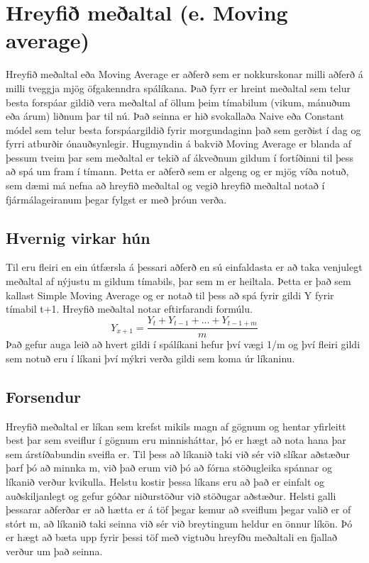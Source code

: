 \section{Hreyfið meðaltal (e. Moving average)}
Hreyfið meðaltal eða Moving Average er aðferð sem er nokkurskonar milli aðferð á milli tveggja mjög öfgakenndra spálíkana. Það fyrr er hreint meðaltal sem telur besta forspáar gildið vera meðaltal af öllum þeim tímabilum (vikum, mánuðum eða árum) liðnum þar til nú. Það seinna er hið svokallaða Naive eða Constant módel sem telur besta forspáargildið fyrir morgundaginn það sem gerðist í dag og fyrri atburðir ónauðsynlegir. Hugmyndin á bakvið Moving Average er blanda af þessum tveim þar sem meðaltal er tekið af ákveðnum gildum í fortíðinni til þess að spá um fram í tímann. Þetta er aðferð sem er algeng og er mjög víða notuð, sem dæmi má nefna að hreyfið meðaltal og vegið hreyfið meðaltal notað í fjármálageiranum þegar fylgst er með þróun verða. 

\subsection{Hvernig virkar hún}
Til eru fleiri en ein útfærsla á þessari aðferð en sú einfaldasta er að taka venjulegt meðaltal af nýjustu m gildum tímabils, þar sem m er heiltala. Þetta er það sem kallast Simple Moving Average og er notað til þess að spá fyrir gildi Y fyrir tímabil t+1. Hreyfið meðaltal notar eftirfarandi formúlu.
$$Y_{x+1} = \frac{Y_t + Y_{t-1} + ... + Y_{t-1+m}}{m}$$
Það gefur auga leið að hvert gildi í spálíkani hefur því vægi 1/m og því fleiri gildi sem notuð eru í líkani því mýkri verða gildi sem koma úr líkaninu. 


\subsection{Forsendur}
Hreyfið meðaltal er líkan sem krefst mikils magn af gögnum og hentar yfirleitt best þar sem sveiflur í gögnum eru minnisháttar, þó er hægt að nota hana þar sem árstíðabundin sveifla er. Til þess að líkanið taki við sér við slíkar aðstæður þarf þó að minnka m, við það erum við þó að fórna stöðugleika spánnar og líkanið verður kvikulla.  
Helstu kostir þessa líkans eru að það er einfalt og auðskiljanlegt og gefur góðar niðurstöður við stöðugar aðstæður. Helsti galli þessarar aðferðar er að hætta er á töf þegar kemur að sveiflum þegar valið er of stórt m, að líkanið taki seinna við sér við breytingum heldur en önnur líkön. Þó er hægt að bæta upp fyrir þessi töf með vigtuðu hreyfðu meðaltali en fjallað verður um það seinna. \cite{Averagingandsmoothingmodels}